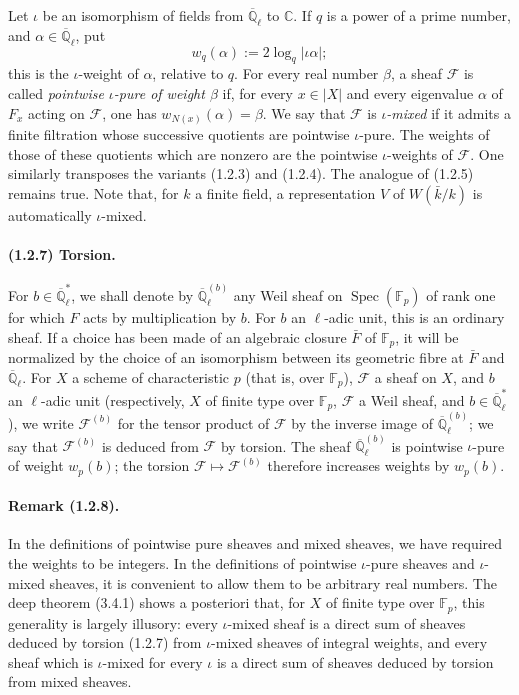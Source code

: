 \documentclass[11pt]{article}
\theoremstyle{remark}
\newcommand{\Qlb}{\overline{\mathbb{Q}}_\ell}
\newcommand{\CC}{\mathbb{C}}
\newcommand{\Fp}{\mathbb{F}_p}
\newcommand{\Spec}{\operatorname{Spec}}
\begin{document}
Let $\iota$ be an isomorphism of fields from $\Qlb$ to $\CC$. If $q$ is a power of a prime number, and $\alpha\in\Qlb$, put
\begin{equation}
\tag{1.2.6.1}
w_q(\alpha):=2\log_q |\iota\alpha|;
\end{equation}
this is the $\iota$-weight of $\alpha$, relative to $q$. For every real number $\beta$, a sheaf $\mathcal F$ is called \emph{pointwise $\iota$-pure of weight $\beta$} if, for every $x\in |X|$ and every eigenvalue $\alpha$ of $F_x$ acting on $\mathcal F$, one has $w_{N(x)}(\alpha)=\beta$. We say that $\mathcal F$ is \emph{$\iota$-mixed} if it admits a finite filtration whose successive quotients are pointwise $\iota$-pure. The weights of those of these quotients which are nonzero are the pointwise $\iota$-weights of $\mathcal F$. One similarly transposes the variants (1.2.3) and (1.2.4). The analogue of (1.2.5) remains true. Note that, for $k$ a finite field, a representation $V$ of $W(\bar k/k)$ is automatically $\iota$-mixed.

\paragraph{(1.2.7) Torsion.} For $b\in \Qlb^*$, we shall denote by $\Qlb^{(b)}$ any Weil sheaf on $\Spec(\Fp)$ of rank one for which $F$ acts by multiplication by $b$. For $b$ an $\ell$-adic unit, this is an ordinary sheaf. If a choice has been made of an algebraic closure $\bar F$ of $\Fp$, it will be normalized by the choice of an isomorphism between its geometric fibre at $\bar F$ and $\Qlb$. For $X$ a scheme of characteristic $p$ (that is, over $\Fp$), $\mathcal F$ a sheaf on $X$, and $b$ an $\ell$-adic unit (respectively, $X$ of finite type over $\Fp$, $\mathcal F$ a Weil sheaf, and $b\in\Qlb^*$), we write $\mathcal F^{(b)}$ for the tensor product of $\mathcal F$ by the inverse image of $\Qlb^{(b)}$; we say that $\mathcal F^{(b)}$ is deduced from $\mathcal F$ by torsion. The sheaf $\Qlb^{(b)}$ is pointwise $\iota$-pure of weight $w_p(b)$; the torsion $\mathcal F\mapsto\mathcal F^{(b)}$ therefore increases weights by $w_p(b)$.

\paragraph{Remark (1.2.8).} In the definitions of pointwise pure sheaves and mixed sheaves, we have required the weights to be integers. In the definitions of pointwise $\iota$-pure sheaves and $\iota$-mixed sheaves, it is convenient to allow them to be arbitrary real numbers. The deep theorem (3.4.1) shows a posteriori that, for $X$ of finite type over $\Fp$, this generality is largely illusory: every $\iota$-mixed sheaf is a direct sum of sheaves deduced by torsion (1.2.7) from $\iota$-mixed sheaves of integral weights, and every sheaf which is $\iota$-mixed for every $\iota$ is a direct sum of sheaves deduced by torsion from mixed sheaves.
\end{document}
